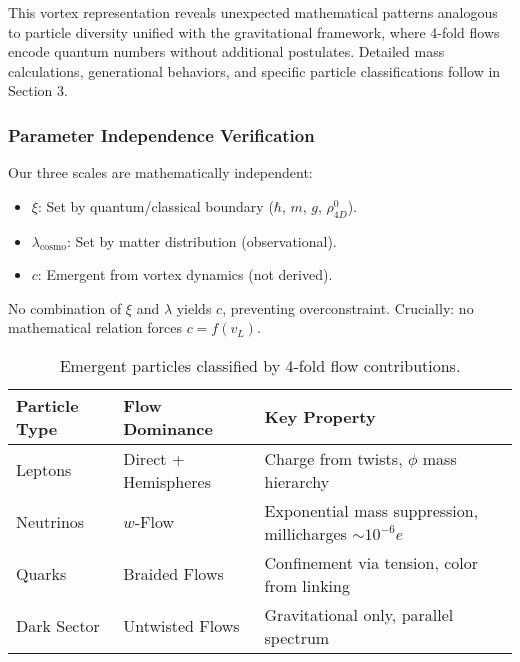 This vortex representation reveals unexpected mathematical patterns analogous to particle diversity unified with the gravitational framework, where 4-fold flows encode quantum numbers without additional postulates. Detailed mass calculations, generational behaviors, and specific particle classifications follow in Section 3.

\subsubsection{Parameter Independence Verification}

Our three scales are mathematically independent:
\begin{itemize}
\item $\xi$: Set by quantum/classical boundary ($\hbar$, $m$, $g$, $\rho_{4D}^0$).
\item $\lambda_{\text{cosmo}}$: Set by matter distribution (observational).
\item $c$: Emergent from vortex dynamics (not derived).
\end{itemize}

No combination of $\xi$ and $\lambda$ yields $c$, preventing overconstraint. Crucially: no mathematical relation forces $c = f(v_L)$.

\begin{table}[h]
\centering
\begin{tabular}{|l|l|l|}
\hline
Particle Type & Flow Dominance & Key Property \\
\hline
Leptons & Direct + Hemispheres & Charge from twists, $\phi$ mass hierarchy \\
Neutrinos & $w$-Flow & Exponential mass suppression, millicharges $\sim 10^{-6} e$ \\
Quarks & Braided Flows & Confinement via tension, color from linking \\
Dark Sector & Untwisted Flows & Gravitational only, parallel spectrum \\
\hline
\end{tabular}
\caption{Emergent particles classified by 4-fold flow contributions.}
\label{tab:particles}
\end{table}

\medskip
\noindent
{}
\medskip
